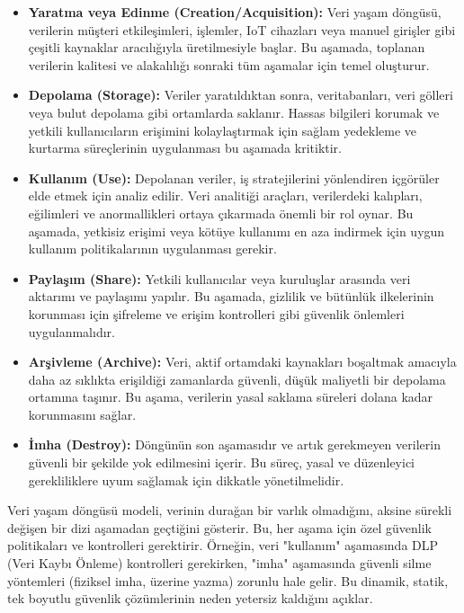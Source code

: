 \begin{itemize}
    \item \textbf{Yaratma veya Edinme (Creation/Acquisition):} Veri yaşam döngüsü, verilerin müşteri etkileşimleri, işlemler, IoT cihazları veya manuel girişler gibi çeşitli kaynaklar aracılığıyla üretilmesiyle başlar. Bu aşamada, toplanan verilerin kalitesi ve alakalılığı sonraki tüm aşamalar için temel oluşturur.
    \item \textbf{Depolama (Storage):} Veriler yaratıldıktan sonra, veritabanları, veri gölleri veya bulut depolama gibi ortamlarda saklanır. Hassas bilgileri korumak ve yetkili kullanıcıların erişimini kolaylaştırmak için sağlam yedekleme ve kurtarma süreçlerinin uygulanması bu aşamada kritiktir.
    \item \textbf{Kullanım (Use):} Depolanan veriler, iş stratejilerini yönlendiren içgörüler elde etmek için analiz edilir. Veri analitiği araçları, verilerdeki kalıpları, eğilimleri ve anormallikleri ortaya çıkarmada önemli bir rol oynar. Bu aşamada, yetkisiz erişimi veya kötüye kullanımı en aza indirmek için uygun kullanım politikalarının uygulanması gerekir.
    \item \textbf{Paylaşım (Share):} Yetkili kullanıcılar veya kuruluşlar arasında veri aktarımı ve paylaşımı yapılır. Bu aşamada, gizlilik ve bütünlük ilkelerinin korunması için şifreleme ve erişim kontrolleri gibi güvenlik önlemleri uygulanmalıdır.
    \item \textbf{Arşivleme (Archive):} Veri, aktif ortamdaki kaynakları boşaltmak amacıyla daha az sıklıkta erişildiği zamanlarda güvenli, düşük maliyetli bir depolama ortamına taşınır. Bu aşama, verilerin yasal saklama süreleri dolana kadar korunmasını sağlar.
    \item \textbf{İmha (Destroy):} Döngünün son aşamasıdır ve artık gerekmeyen verilerin güvenli bir şekilde yok edilmesini içerir. Bu süreç, yasal ve düzenleyici gerekliliklere uyum sağlamak için dikkatle yönetilmelidir.
\end{itemize}

Veri yaşam döngüsü modeli, verinin durağan bir varlık olmadığını, aksine sürekli değişen bir dizi aşamadan geçtiğini gösterir. Bu, her aşama için özel güvenlik politikaları ve kontrolleri gerektirir. Örneğin, veri "kullanım" aşamasında DLP (Veri Kaybı Önleme) kontrolleri gerekirken, "imha" aşamasında güvenli silme yöntemleri (fiziksel imha, üzerine yazma) zorunlu hale gelir. Bu dinamik, statik, tek boyutlu güvenlik çözümlerinin neden yetersiz kaldığını açıklar.

